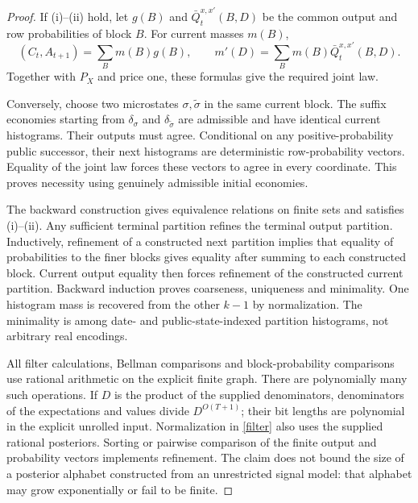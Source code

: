 \documentclass[11pt]{article}
\begin{document}
\begin{proof}
If (i)--(ii) hold, let $g(B)$ and $\bar Q_t^{x,x'}(B,D)$ be the common output and row probabilities of block $B$. For current masses $m(B)$,
\[
 (C_t,A_{t+1})=\sum_Bm(B)g(B),\qquad
 m'(D)=\sum_Bm(B)\bar Q_t^{x,x'}(B,D).
\]
Together with $P_X$ and price one, these formulas give the required joint law.

Conversely, choose two microstates $\sigma,\widetilde\sigma$ in the same current block. The suffix economies starting from $\delta_\sigma$ and $\delta_{\widetilde\sigma}$ are admissible and have identical current histograms. Their outputs must agree. Conditional on any positive-probability public successor, their next histograms are deterministic row-probability vectors. Equality of the joint law forces these vectors to agree in every coordinate. This proves necessity using genuinely admissible initial economies.

The backward construction gives equivalence relations on finite sets and satisfies (i)--(ii). Any sufficient terminal partition refines the terminal output partition. Inductively, refinement of a constructed next partition implies that equality of probabilities to the finer blocks gives equality after summing to each constructed block. Current output equality then forces refinement of the constructed current partition. Backward induction proves coarseness, uniqueness and minimality. One histogram mass is recovered from the other $k-1$ by normalization. The minimality is among date- and public-state-indexed partition histograms, not arbitrary real encodings.

All filter calculations, Bellman comparisons and block-probability comparisons use rational arithmetic on the explicit finite graph. There are polynomially many such operations. If $D$ is the product of the supplied denominators, denominators of the expectations and values divide $D^{O(T+1)}$; their bit lengths are polynomial in the explicit unrolled input. Normalization in \eqref{filter} also uses the supplied rational posteriors. Sorting or pairwise comparison of the finite output and probability vectors implements refinement. The claim does not bound the size of a posterior alphabet constructed from an unrestricted signal model: that alphabet may grow exponentially or fail to be finite.
\end{proof}
\end{document}
